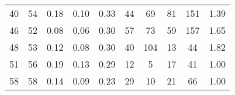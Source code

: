 \begin{tabular}{lccccccccc}
40 &       54 &                             0.18 &                             0.10 &                             0.33 &              44 &              69 &                                 81 &                             151 &       1.39 \\
46 &       52 &                             0.08 &                             0.06 &                             0.30 &              57 &              73 &                                 59 &                             157 &       1.65 \\
48 &       53 &                             0.12 &                             0.08 &                             0.30 &              40 &             104 &                                 13 &                              44 &       1.82 \\
51 &       56 &                             0.19 &                             0.13 &                             0.29 &              12 &               5 &                                 17 &                              41 &       1.00 \\
58 &       58 &                             0.14 &                             0.09 &                             0.23 &              29 &              10 &                                 21 &                              66 &       1.00 \\
\bottomrule
\end{tabular}
